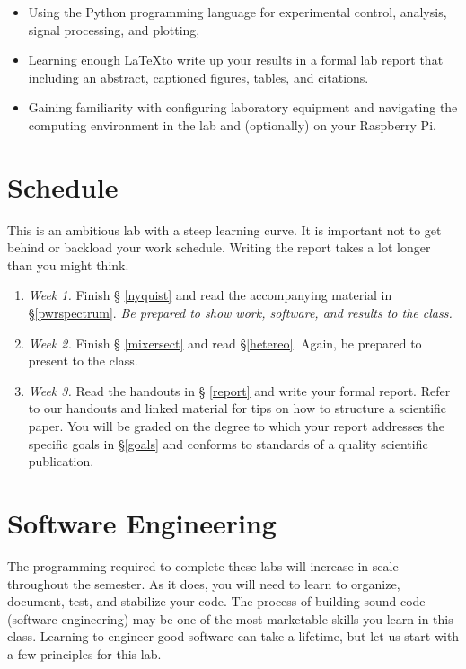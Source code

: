 \documentclass[11pt,preprint]{aastex}
\begin{document}
\begin{itemize}

\item Using the Python programming language for experimental control, analysis, 
signal processing, and plotting,

\item Learning enough \LaTeX to write up your results in a formal lab
  report that including an abstract, captioned figures, tables, and citations.

\item Gaining familiarity with configuring laboratory equipment 
and navigating the computing environment in the lab and (optionally)
on your Raspberry Pi.

\end{itemize}

\section{Schedule}

\noindent
This is an ambitious lab with a steep learning curve.
It is important not to get behind or backload your work schedule.
Writing the report takes a lot longer than you might think.
\begin{enumerate}

\item {\it Week 1.} Finish \S
  \ref{nyquist} and read the accompanying
  material in \S \ref{pwrspectrum}. {\it Be prepared to show work, 
  software, and results to the class.}

\item {\it Week 2.} Finish \S
  \ref{mixersect} and read \S \ref{hetereo}. Again, be prepared
  to present to the class.

\item {\it Week 3.} Read the handouts in \S
  \ref{report} and write your formal report.  Refer to
  our handouts and linked material for tips on how to structure
  a scientific paper. You will be graded on the degree to which your
  report addresses the specific goals in \S\ref{goals} and conforms to
  standards of a quality scientific publication.

\end{enumerate}

\section{Software Engineering}

\noindent
The programming required to complete these labs will increase in scale throughout the semester.
As it does, you will need to learn to organize, document, test, and stabilize your code.  The process
of building sound code (software engineering)
may be one of the most marketable skills you learn in this class.
Learning to engineer good software can take a lifetime, but let us start with a few
principles for this lab.
\end{document}
